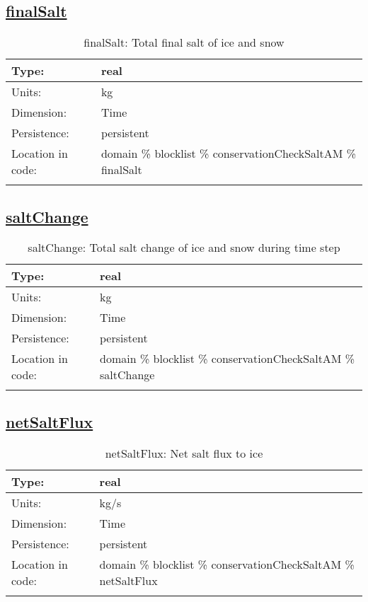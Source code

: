 \subsection[finalSalt]{\hyperref[sec:var_tab_conservationCheckSaltAM]{finalSalt}}
\label{subsec:var_sec_conservationCheckSaltAM_finalSalt}
\begin{center}
\begin{longtable}{| p{2.0in} | p{4.0in} |}
        \hline 
        Type: & real \\
        \hline 
        Units: & \si{kg} \\
        \hline 
        Dimension: & Time \\
        \hline 
        Persistence: & persistent \\
        \hline 
         Location in code: & domain \% blocklist \% conservationCheckSaltAM \% finalSalt \\
         \hline 
    \caption{finalSalt: Total final salt of ice and snow}
\end{longtable}
\end{center}
\subsection[saltChange]{\hyperref[sec:var_tab_conservationCheckSaltAM]{saltChange}}
\label{subsec:var_sec_conservationCheckSaltAM_saltChange}
\begin{center}
\begin{longtable}{| p{2.0in} | p{4.0in} |}
        \hline 
        Type: & real \\
        \hline 
        Units: & \si{kg} \\
        \hline 
        Dimension: & Time \\
        \hline 
        Persistence: & persistent \\
        \hline 
         Location in code: & domain \% blocklist \% conservationCheckSaltAM \% saltChange \\
         \hline 
    \caption{saltChange: Total salt change of ice and snow during time step}
\end{longtable}
\end{center}
\subsection[netSaltFlux]{\hyperref[sec:var_tab_conservationCheckSaltAM]{netSaltFlux}}
\label{subsec:var_sec_conservationCheckSaltAM_netSaltFlux}
\begin{center}
\begin{longtable}{| p{2.0in} | p{4.0in} |}
        \hline 
        Type: & real \\
        \hline 
        Units: & \si{kg/s} \\
        \hline 
        Dimension: & Time \\
        \hline 
        Persistence: & persistent \\
        \hline 
         Location in code: & domain \% blocklist \% conservationCheckSaltAM \% netSaltFlux \\
         \hline 
    \caption{netSaltFlux: Net salt flux to ice}
\end{longtable}
\end{center}
